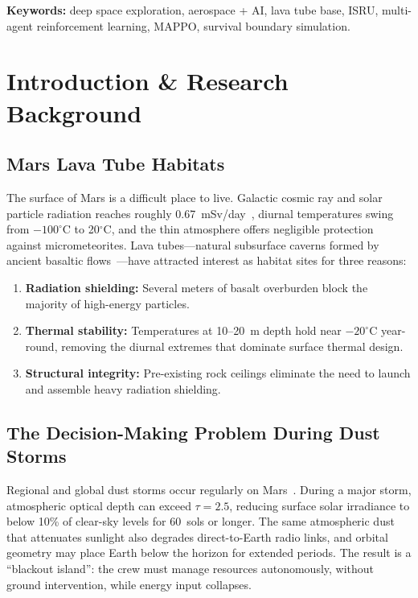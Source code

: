 \documentclass[11pt,a4paper]{article}
\begin{document}
\vspace{10pt}
\noindent\textbf{Keywords:} deep space exploration, aerospace + AI, lava tube base, ISRU, multi-agent reinforcement learning, MAPPO, survival boundary simulation.

\newpage

\tableofcontents
\newpage

\section{Introduction \& Research Background}

\subsection{Mars Lava Tube Habitats}

The surface of Mars is a difficult place to live. Galactic cosmic ray and solar particle radiation reaches roughly 0.67~mSv/day~\cite{mars_radiation}, diurnal temperatures swing from $-100^\circ$C to 20$^\circ$C, and the thin atmosphere offers negligible protection against micrometeorites. Lava tubes---natural subsurface caverns formed by ancient basaltic flows~\cite{mars_lava_tube}---have attracted interest as habitat sites for three reasons:

\begin{enumerate}[label=(\roman*)]
  \item \textbf{Radiation shielding:} Several meters of basalt overburden block the majority of high-energy particles.
  \item \textbf{Thermal stability:} Temperatures at 10--20~m depth hold near $-20^\circ$C year-round, removing the diurnal extremes that dominate surface thermal design.
  \item \textbf{Structural integrity:} Pre-existing rock ceilings eliminate the need to launch and assemble heavy radiation shielding.
\end{enumerate}

\subsection{The Decision-Making Problem During Dust Storms}

Regional and global dust storms occur regularly on Mars~\cite{mars_dust}. During a major storm, atmospheric optical depth can exceed $\tau = 2.5$, reducing surface solar irradiance to below 10\% of clear-sky levels for 60~sols or longer. The same atmospheric dust that attenuates sunlight also degrades direct-to-Earth radio links, and orbital geometry may place Earth below the horizon for extended periods. The result is a ``blackout island'': the crew must manage resources autonomously, without ground intervention, while energy input collapses.
\end{document}
